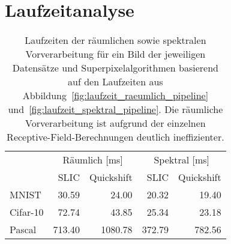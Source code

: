 \section{Laufzeitanalyse}
\label{laufzeitanalyse}





\begin{table}[t]
\centering
\begin{tabular}{lrrrr}
  \toprule
  & \multicolumn{2}{c}{Räumlich [ms]} & \multicolumn{2}{c}{Spektral [ms]}\\
  \cmidrule{2-5}
  & \gls{SLIC} & Quickshift & \gls{SLIC} & Quickshift\\
  \midrule
  \gls{MNIST} & 30.59 & 24.00 & 20.32 & 19.40\\
  \gls{Cifar}-10 & 72.74 & 43.85 & 25.34 & 23.18\\
  \gls{Pascal} & 713.40 & 1080.78 & 372.79 & 782.56\\
  \bottomrule
\end{tabular}
\caption[Laufzeiten der räumlichen und spektralen Vorverarbeitung]{Laufzeiten der räumlichen sowie spektralen Vorverarbeitung für ein Bild der jeweiligen Datensätze und Superpixelalgorithmen basierend auf den Laufzeiten aus Abbildung~\ref{fig:laufzeit_raeumlich_pipeline} und~\ref{fig:laufzeit_spektral_pipeline}.
Die räumliche Vorverarbeitung ist aufgrund der einzelnen Receptive-Field-Berechnungen deutlich ineffizienter.}
\label{tab:laufzeit_raeumlich_spektral}
\end{table}

